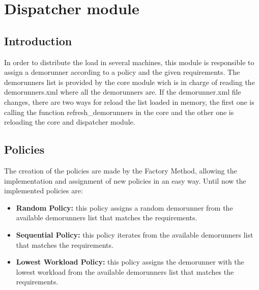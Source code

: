 \section{Dispatcher module}
\label{sec:Dispatcher}
\subsection{Introduction}
In order to distribute the load in several machines, this module is responsible to assign a demorunner according to a policy and the given requirements. 
The demorunners list is provided by the core module wich is in charge of reading the demorunners.xml where all the demorunners are. If the 
demorunner.xml file changes, there are two ways for reload the list loaded in memory, the first one is calling the function refresh\_demorunners
in the core and the other one is reloading the core and dispatcher module.

\subsection{Policies}
The creation of the policies are made by the Factory Method, allowing the implementation and assignment of new policies in an easy way.
Until now the implemented policies are:

\begin{itemize}
\item \textbf{Random Policy:} this policy assigns a random demorunner from the available demorunners list that matches the requirements.
\item \textbf{Sequential Policy:} this policy iterates from the available demorunners list that matches the requirements.
\item \textbf{Lowest Workload Policy:} this policy assigns the demorunner with the lowest workload from the available demorunners list that matches the requirements.
\end{itemize}
